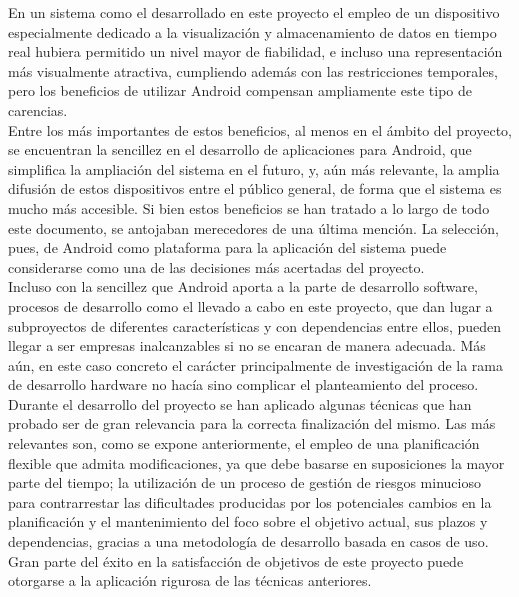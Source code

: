 	En un sistema como el desarrollado en este proyecto el empleo de un dispositivo especialmente dedicado a la visualización y almacenamiento de datos en tiempo real hubiera permitido un nivel mayor de fiabilidad, e incluso una representación más visualmente atractiva, cumpliendo además con las restricciones temporales, pero los beneficios de utilizar Android compensan ampliamente este tipo de carencias.\\

	Entre los más importantes de estos beneficios, al menos en el ámbito del proyecto,  se encuentran la sencillez en el desarrollo de aplicaciones para Android, que simplifica la ampliación del sistema en el futuro, y, aún más relevante, la amplia difusión de estos dispositivos entre el público general, de forma que el sistema es mucho más accesible.
	Si bien estos beneficios se han tratado a lo largo de todo este documento, se antojaban merecedores de una última mención. La selección, pues, de Android como plataforma para la aplicación del sistema puede considerarse como una de las decisiones más acertadas del proyecto.\\

	Incluso con la sencillez que Android aporta a la parte de desarrollo software, procesos de desarrollo como el llevado a cabo en este proyecto, que dan lugar a subproyectos de diferentes características y con dependencias entre ellos, pueden llegar a ser empresas inalcanzables si no se encaran de manera adecuada. Más aún, en este caso concreto el carácter principalmente de investigación de la rama de desarrollo hardware no hacía sino complicar el planteamiento del proceso.\\

	Durante el desarrollo del proyecto se han aplicado algunas técnicas que han probado ser de gran relevancia para la correcta finalización del mismo. Las más relevantes son, como se expone anteriormente, el empleo de una planificación flexible que admita modificaciones, ya que debe basarse en suposiciones la mayor parte del tiempo; la utilización de un proceso de gestión de riesgos minucioso para contrarrestar las dificultades producidas por los potenciales cambios en la planificación y el mantenimiento del foco sobre el objetivo actual, sus plazos y dependencias, gracias a una metodología de desarrollo basada en casos de uso. Gran parte del éxito en la satisfacción de objetivos de este proyecto puede otorgarse a la aplicación rigurosa de las técnicas anteriores.\\

